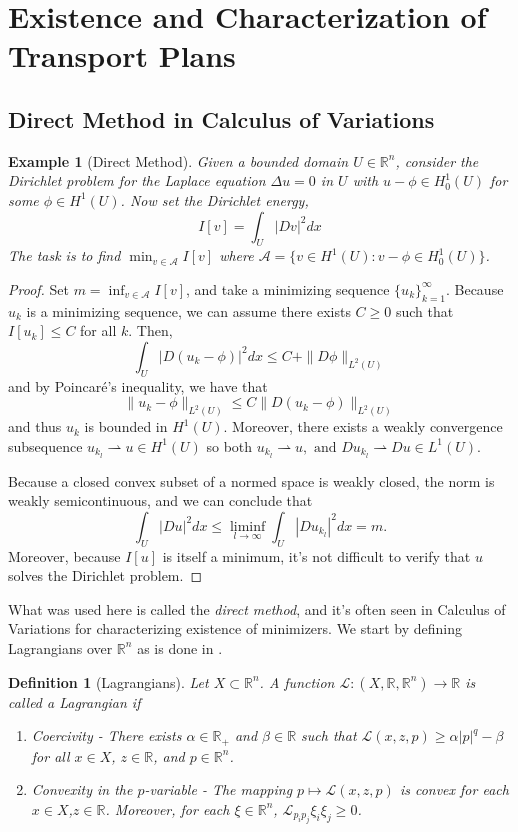 \documentclass[12pt]{article}
\newcommand{\R}{\mathbb{R}}
\theoremstyle{plain}
\newtheorem{defn}{Definition}[section]
\newtheorem{exmp}{Example}[section]
\numberwithin{equation}{section}
\begin{document}
\section{Existence and Characterization of Transport Plans}

\subsection{Direct Method in Calculus of Variations}
\begin{exmp}[Direct Method]
  Given a bounded domain $U\in \R^n$, consider the Dirichlet problem for the Laplace equation $\Delta u = 0$ in $U$ with $u-\phi \in H_0^1(U)$ for some $\phi \in H^1(U)$. Now set the Dirichlet energy,
  \[I[v] = \int_U |Dv|^2dx\]
  The task is to find $\min_{v\in\mathcal{A}} I[v]$ where $\mathcal{A} = \{v\in H^1(U) : v - \phi \in H^1_0(U)\}$.
\end{exmp}
\begin{proof}
  Set $m = \inf_{v\in\mathcal{A}} I[v]$, and take a minimizing sequence $\{u_k\}_{k=1}^\infty$. Because $u_k$ is a minimizing sequence, we can assume there exists $C \ge 0$ such that $I[u_k]\le C$ for all $k$. Then,
  \[\int_U |D(u_k - \phi)|^2 dx \le C + \|D\phi\|_{L^2(U)}\]
  and by Poincar\'e's inequality, we have that 
  \[\|u_k-\phi\|_{L^2(U)} \le C\|D(u_k-\phi)\|_{L^2(U)}\]
  and thus $u_k$ is bounded in $H^1(U)$. Moreover, there exists a weakly convergence subsequence 
  \(u_{k_l}\rightharpoonup u\in H^1(U)\) so both \(u_{k_l}\rightharpoonup u,\text{ and }Du_{k_l}\rightharpoonup Du\in L^1(U)\).

  Because a closed convex subset of a normed space is weakly closed, the norm is weakly semicontinuous, and we can conclude that 
  \[\int_U |Du|^2 dx \le \liminf_{l\to\infty}\int_U |Du_{k_l}|^2dx = m.\]
  Moreover, because $I[u]$ is itself a minimum, it's not difficult to verify that $u$ solves the Dirichlet problem.
\end{proof}
What was used here is called the \textit{direct method}, and it's often seen in Calculus of Variations for characterizing existence of minimizers. We start by defining Lagrangians over $\R^n$ as is done in \cite{evans}.
\begin{defn}[Lagrangians]\label{defn:lagrangian}
  Let $X \subset \R^n$. A function $\mathcal{L} : (X, \R,\R^n) \to \R$ is called a Lagrangian if 
  \begin{enumerate}
    \item Coercivity - There exists $\alpha \in \R_+$ and $\beta\in \R$ such that $\mathcal{L}(x,z,p) \ge \alpha|p|^q - \beta$ for all $x\in X$, $z\in \R$, and $p\in\R^n$.
    \item Convexity in the $p$-variable - The mapping $p\mapsto \mathcal{L}(x,z,p)$ is convex for each $x\in X$,$z\in \R$. Moreover, for each $\xi\in\R^n$, $\mathcal{L}_{p_ip_j}\xi_i\xi_j \ge 0$.
  \end{enumerate}
\end{defn}
\end{document}
